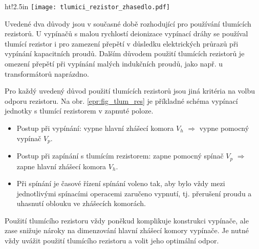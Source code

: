    \begin{wrapfigure}{ht!}{2.5in}
      \centering
      \texttt{[image: tlumici\_rezistor\_zhasedlo.pdf]}
      \caption[Schéma spínací jednotky vypínače s tlumícím rezistorem.]{Schéma spínací jednotky vypínače s tlumícím rezistorem.($V_h\cdots$ hlavní zhášecí komora, $V_p\cdots$ pomocný spínač, $R \cdots$ tlumící rezistor.)}
      \label{epr:fig_tlum_res}
    \end{wrapfigure}

    Uvedené dva důvody jsou v současné době rozhodující pro používání tlumících rezistorů. U vypínačů s malou rychlostí deionizace vypínací dráhy se používal tlumící rezistor i pro zamezení přepětí v důsledku elektrických průrazů při vypínání kapacitních proudů. Dalším důvodem použití tlumících rezistorů je omezení přepětí při vypínání malých indukčních proudů, jako např. u transformátorů naprázdno.

    Pro každý uvedený důvod použití tlumících rezistorů jsou jiná kritéria na volbu odporu rezistoru. Na obr. \ref{epr:fig_tlum_res} je příkladné schéma vypínací jednotky s tlumící rezistorem v zapnuté poloze.
    \begin{itemize}
      \item Postup při vypínání: vypne hlavní zhášecí komora $V_h$ $\Rightarrow$ vypne pomocný vypínač $V_p$.
      \item Postup při zapínání s tlumícím rezistorem: zapne pomocný spínač $V_p$ $\Rightarrow$ zapne hlavní zhášecí komora $V_h$.
      \item Při spínání je časové řízení spínání voleno tak, aby bylo vždy mezi jednotlivými spínacími operacemi zaručeno vypnutí, tj. přerušení
      proudu a uhasnutí oblou\-ku ve zhášecích komorách.
    \end{itemize}

   Použití tlumícího rezistoru vždy poněkud komplikuje konstrukci vypínače, ale zase snižuje nároky na dimenzování hlavní zhášecí komory vypínače. Je nutné vždy uvážit použití tlumícího rezistoru a volit jeho optimální odpor.
